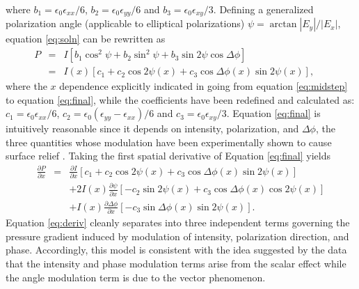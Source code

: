 \documentclass[aps, prl, twocolumn, groupedaddress]{revtex4-1}
\begin{document}
where $b_1 = \epsilon_0 \epsilon_{xx} / 6$, $b_2 =\epsilon_0
\epsilon_{yy} / 6$ and $b_3 = \epsilon_0 \epsilon_{xy} / 3$.
Defining a generalized polarization angle (applicable to elliptical polarizations)
$\psi=\arctan\left|E_y\right|/\left|E_x\right|$, equation
\ref{eq:soln} can be rewritten as
\begin{eqnarray}
P & = & I\left[b_1\cos^2\psi+b_2\sin^2\psi+b_3\sin2\psi\cos\Delta\phi\right] \ \ \ \ \ \label{eq:midstep}\\
& = & I(x)\left[c_1+c_2\cos2\psi(x)+c_3\cos\Delta\phi(x)\sin2\psi(x)\right]\mathrm{,} \ \
\ \ \ \  \label{eq:final}
\end{eqnarray}
where the $x$ dependence explicitly indicated in going from equation
\ref{eq:midstep} to equation \ref{eq:final}, while the coefficients
have been redefined and calculated as: $c_1 = \epsilon_0 \epsilon_{xx}
/ 6$, $c_2 =\epsilon_0 (\epsilon_{yy} - \epsilon_{xx}) / 6$ and $c_3 =
\epsilon_0 \epsilon_{xy} / 3$. Equation \ref{eq:final} is intuitively
reasonable since it depends on intensity, polarization, and
$\Delta\phi$, the three quantities whose modulation have been
experimentally shown to cause surface relief \cite{tanaka,
saliminia}. Taking the first spatial derivative of Equation
\ref{eq:final} yields
\begin{eqnarray}
\frac{\partial P}{\partial x}& = &\frac{\partial I}{\partial x}\left[c_1+c_2\cos2\psi(x)+c_3\cos\Delta\phi(x)\sin2\psi(x)\right] \nonumber\\
&&+2I(x)\frac{\partial \psi}{\partial x} \left[-c_2\sin2\psi(x)+c_3\cos\Delta\phi(x)\cos2\psi(x)\right] \nonumber\\
&&+I(x)\frac{\partial \Delta\phi}{\partial x}
\left[-c_3\sin\Delta\phi(x)\sin2\psi(x)\right] \mathrm{.} \label{eq:deriv}
\end{eqnarray}
Equation \ref{eq:deriv} cleanly separates into three independent terms
governing the pressure gradient induced by modulation of intensity,
polarization direction, and phase.  Accordingly, this model is
consistent with the idea suggested by the data that the intensity and
phase modulation terms arise from the scalar effect while the angle
modulation term is due to the vector phenomenon.
\end{document}

